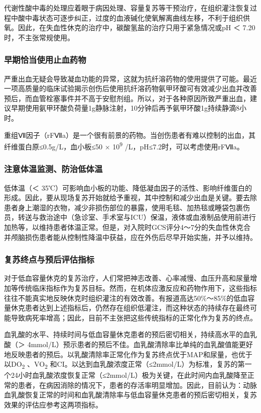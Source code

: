 代谢性酸中毒的处理应着眼于病因处理、容量复苏等干预治疗，在组织灌注恢复过程中酸中毒状态可逐步纠正，过度的血液碱化使氧解离曲线左移，不利于组织供氧。因此，在失血性休克的治疗中，碳酸氢盐的治疗只用于紧急情况或pH
＜ 7.20时，不主张常规使用。

\subsubsection{早期恰当使用止血药物}

严重出血无疑会导致凝血功能的异常，这就为抗纤溶药物的使用提供了可能。最近一项高质量的临床试验揭示创伤后使用抗纤溶药物氨甲环酸可有效减少出血并改善预后，而血管栓塞事件并不高于安慰剂组。所以，对于各种原因所致严重出血，建议早期使用氨甲环酸负荷量1g静脉注射，10分钟后再予氨甲环酸1g持续静滴8小时。

重组Ⅶ因子（rFⅦa）是一个很有前景的药物。当创伤患者有难以控制的出血，其纤维蛋白原≤0.5g/L，血小板≤50
× 10\textsuperscript{9} /L，pH≤7.2时，可以考虑使用rFⅦa。

\subsubsection{注意体温监测、防治低体温}

低体温（＜
35℃）可影响血小板的功能、降低凝血因子的活性、影响纤维蛋白的形成。因此，要从现场复苏开始就给予重视，其中控制和减少出血是关键。要去除患者身上潮湿的衣物，减少非损伤部位的暴露，使用毛毯、加热毯或睡袋包裹伤员，转送与救治途中（急诊室、手术室与ICU）保温，液体或血液制品使用前进行加热等，以维持患者体温正常。但是，对入院时GCS评分4～7分的失血性休克合并颅脑损伤患者能从控制性降温中获益，应在外伤后尽早开始实施，并予以维持。

\subsubsection{复苏终点与预后评估指标}

对于低血容量休克的复苏治疗，人们常把神志改善、心率减慢、血压升高和尿量增加等传统临床指标作为复苏目标。然而，在机体应激反应和药物作用下，这些指标往往不能真实地反映休克时组织灌注的有效改善。有报道高达50\%～85\%的低血容量休克患者达到上述指标后，仍然存在组织低灌注，而这种状态的持续存在最终可能导致病死率增高；因此，目前不主张把这些传统指标的正常化作为复苏的终点。

血乳酸的水平、持续时间与低血容量休克患者的预后密切相关，持续高水平的血乳酸（＞
4mmol/L）预示患者的预后不佳。血乳酸清除率比单纯的血乳酸值能更好地反映患者的预后。以乳酸清除率正常化作为复苏终点优于MAP和尿量，也优于以DO\textsubscript{2}
、VO\textsubscript{2}
和CI。以达到血乳酸浓度正常（≤2mmol/L）为标准，复苏的第一个24小时血乳酸浓度恢复正常（≤2mmol/L）极为关键，在此时间内血乳酸降至正常的患者，在病因消除的情况下，患者的存活率明显增加。因此，目前认为：动脉血乳酸恢复正常的时间和血乳酸清除率与低血容量休克患者的预后密切相关，复苏效果的评估应参考这两项指标。

